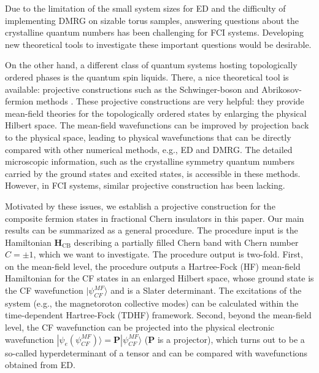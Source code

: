 Due to the limitation of the small system sizes for ED and the difficulty of implementing DMRG on sizable torus samples, answering questions about the crystalline quantum numbers has been challenging for FCI systems. Developing new theoretical tools to investigate these important questions would be desirable.

On the other hand, a different class of quantum systems hosting topologically ordered phases is the quantum spin liquids. There, a nice theoretical tool is available: projective constructions such as the Schwinger-boson and Abrikosov-fermion methods \cite{arovas1988functional,read1991large,sachdev1991large,sachdev1992kagome,wang2010schwinger,wen1991mean,wen2002quantum,gros1989physics,tay2011variational}. These projective constructions are very helpful: they provide mean-field theories for the topologically ordered states by enlarging the physical Hilbert space. The mean-field wavefunctions can be improved by projection back to the physical space, leading to physical wavefunctions that can be directly compared with other numerical methods, e.g., ED and DMRG. The detailed microscopic information, such as the crystalline symmetry quantum numbers carried by the ground states and excited states, is accessible in these methods. However, in FCI systems, similar projective construction has been lacking.

Motivated by these issues, we establish a projective construction for the composite fermion states in fractional Chern insulators in this paper. Our main results can be summarized as a general procedure. The procedure input is the Hamiltonian $\mathbf H_{\text{CB}}$ describing a partially filled Chern band with Chern number $C=\pm 1$, which we want to investigate. The procedure output is two-fold. First, on the mean-field level, the procedure outputs a Hartree-Fock (HF) mean-field Hamiltonian for the CF states in an enlarged Hilbert space, whose ground state is the CF wavefunction $|\psi^{MF}_{CF}\rangle$ and is a Slater determinant. The excitations of the system (e.g., the magnetoroton collective modes) can be calculated within the time-dependent Hartree-Fock (TDHF) framework. Second, beyond the mean-field level, the CF wavefunction can be projected into the physical electronic wavefunction $|\psi_{e}(\psi^{MF}_{CF})\rangle=\mathbf P |\psi^{MF}_{CF}\rangle$ ($\mathbf P$ is a projector), which turns out to be a so-called hyperdeterminant of a tensor and can be compared with wavefunctions obtained from ED.

